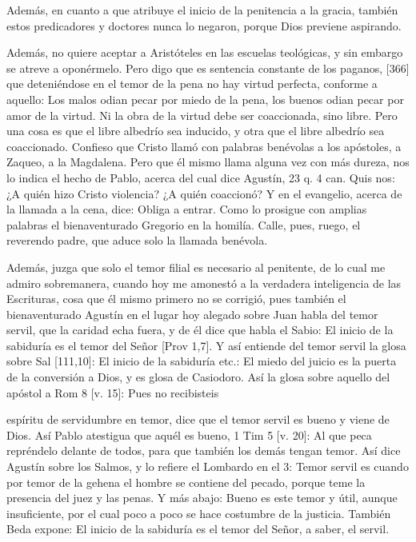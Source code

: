 Además, en cuanto a que atribuye el inicio de la penitencia a la gracia, también estos predicadores y doctores nunca lo negaron, porque Dios previene aspirando.

Además, no quiere aceptar a Aristóteles en las escuelas teológicas, y sin embargo se atreve a oponérmelo. Pero digo que es sentencia constante de los paganos, [366] que deteniéndose en el temor de la pena no hay virtud perfecta, conforme a aquello: Los malos odian pecar por miedo de la pena, los buenos odian pecar por amor de la virtud. Ni la obra de la virtud debe ser coaccionada, sino libre. Pero una cosa es que el libre albedrío sea inducido, y otra que el libre albedrío sea coaccionado. Confieso que Cristo llamó con palabras benévolas a los apóstoles, a Zaqueo, a la Magdalena. Pero que él mismo llama alguna vez con más dureza, nos lo indica el hecho de Pablo, acerca del cual dice Agustín, 23 q. 4 can. Quis nos: ¿A quién hizo Cristo violencia? ¿A quién coaccionó? Y en el evangelio, acerca de la llamada a la cena, dice: Obliga a entrar. Como lo prosigue con amplias palabras el bienaventurado Gregorio en la homilía. Calle, pues, ruego, el reverendo padre, que aduce solo la llamada benévola.

Además, juzga que solo el temor filial es necesario al penitente, de lo cual me admiro sobremanera, cuando hoy me amonestó a la verdadera inteligencia de las Escrituras, cosa que él mismo primero no se corrigió, pues también el bienaventurado Agustín en el lugar hoy alegado sobre Juan habla del temor servil, que la caridad echa fuera, y de él dice que habla el Sabio: El inicio de la sabiduría es el temor del Señor [Prov 1,7]. Y así entiende del temor servil la glosa sobre Sal [111,10]: El inicio de la sabiduría etc.: El miedo del juicio es la puerta de la conversión a Dios, y es glosa de Casiodoro. Así la glosa sobre aquello del apóstol a Rom 8 [v. 15]: Pues no recibisteis

espíritu de servidumbre en temor, dice que el temor servil es bueno y viene de Dios. Así Pablo atestigua que aquél es bueno, 1 Tim 5 [v. 20]: Al que peca repréndelo delante de todos, para que también los demás tengan temor. Así dice Agustín sobre los Salmos, y lo refiere el Lombardo en el 3: Temor servil es cuando por temor de la gehena el hombre se contiene del pecado, porque teme la presencia del juez y las penas. Y más abajo: Bueno es este temor y útil, aunque insuficiente, por el cual poco a poco se hace costumbre de la justicia. También Beda expone: El inicio de la sabiduría es el temor del Señor, a saber, el servil.

